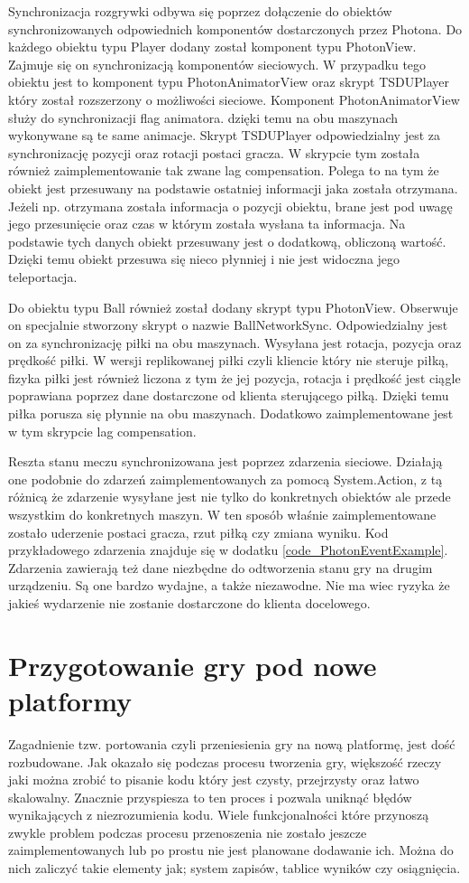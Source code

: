 \documentclass[a4paper,12pt,twoside,openany]{report}
\begin{document}
Synchronizacja rozgrywki odbywa się poprzez dołączenie do obiektów synchronizowanych odpowiednich komponentów dostarczonych przez Photona. Do każdego obiektu typu Player dodany został komponent typu PhotonView. Zajmuje się on synchronizacją komponentów sieciowych. W przypadku tego obiektu jest to komponent typu PhotonAnimatorView oraz skrypt TSDUPlayer który został rozszerzony o możliwości sieciowe. Komponent PhotonAnimatorView służy do synchronizacji flag animatora. dzięki temu na obu maszynach wykonywane są te same animacje. Skrypt TSDUPlayer odpowiedzialny jest za synchronizację pozycji oraz rotacji postaci gracza. W skrypcie tym została również zaimplementowanie tak zwane lag compensation. Polega to na tym że obiekt jest przesuwany na podstawie ostatniej informacji jaka została otrzymana. Jeżeli np. otrzymana została informacja o pozycji obiektu, brane jest pod uwagę jego przesunięcie oraz czas w którym została wysłana ta informacja. Na podstawie tych danych obiekt przesuwany jest o dodatkową, obliczoną wartość. Dzięki temu obiekt przesuwa się nieco płynniej i nie jest widoczna jego teleportacja. 

Do obiektu typu Ball również został dodany skrypt typu PhotonView. Obserwuje on specjalnie stworzony skrypt o nazwie BallNetworkSync. Odpowiedzialny jest on za synchronizację piłki na obu maszynach. Wysyłana jest rotacja, pozycja oraz prędkość piłki. W wersji replikowanej piłki czyli kliencie który nie steruje piłką, fizyka piłki jest również liczona z tym że jej pozycja, rotacja i prędkość jest ciągle poprawiana poprzez dane dostarczone od klienta sterującego piłką. Dzięki temu piłka porusza się płynnie na obu maszynach. Dodatkowo zaimplementowane jest w tym skrypcie lag compensation.  

Reszta stanu meczu synchronizowana jest poprzez zdarzenia sieciowe. Działają one podobnie do zdarzeń zaimplementowanych za pomocą System.Action, z tą różnicą że zdarzenie wysyłane jest nie tylko do konkretnych obiektów ale przede wszystkim do konkretnych maszyn. W ten sposób właśnie zaimplementowane zostało uderzenie postaci gracza, rzut piłką czy zmiana wyniku. Kod przykładowego zdarzenia znajduje się w dodatku \ref{code_PhotonEventExample}. Zdarzenia zawierają też dane niezbędne do odtworzenia stanu gry na drugim urządzeniu. Są one bardzo wydajne, a także niezawodne. Nie ma wiec ryzyka że jakieś wydarzenie nie  zostanie dostarczone do klienta docelowego.




\section{Przygotowanie gry pod nowe platformy}
Zagadnienie tzw. portowania czyli przeniesienia gry na nową platformę, jest dość rozbudowane. Jak okazało się podczas procesu tworzenia gry, większość rzeczy jaki można zrobić to pisanie kodu który jest czysty, przejrzysty oraz łatwo skalowalny. Znacznie przyspiesza to ten proces i pozwala uniknąć błędów wynikających z niezrozumienia kodu. Wiele funkcjonalności które przynoszą zwykle problem podczas procesu przenoszenia nie zostało jeszcze zaimplementowanych lub po prostu nie jest planowane dodawanie ich. Można do nich zaliczyć takie elementy jak; system zapisów, tablice wyników czy osiągnięcia.
\end{document}
